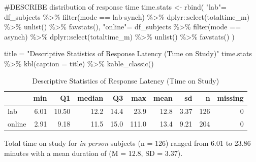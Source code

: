 \documentclass[
  letterpaper,
  DIV=11,
  numbers=noendperiod]{scrreprt}
\newenvironment{Shaded}{\begin{snugshade}}{\end{snugshade}}
\newcommand{\AttributeTok}[1]{\textcolor[rgb]{0.40,0.45,0.13}{#1}}
\newcommand{\CommentTok}[1]{\textcolor[rgb]{0.37,0.37,0.37}{#1}}
\newcommand{\FunctionTok}[1]{\textcolor[rgb]{0.28,0.35,0.67}{#1}}
\newcommand{\NormalTok}[1]{\textcolor[rgb]{0.00,0.23,0.31}{#1}}
\newcommand{\OtherTok}[1]{\textcolor[rgb]{0.00,0.23,0.31}{#1}}
\newcommand{\SpecialCharTok}[1]{\textcolor[rgb]{0.37,0.37,0.37}{#1}}
\newcommand{\StringTok}[1]{\textcolor[rgb]{0.13,0.47,0.30}{#1}}
\begin{document}
\begin{Shaded}
\begin{Highlighting}[]
\CommentTok{\#DESCRIBE distribution of response time}
\NormalTok{time.stats }\OtherTok{\textless{}{-}} \FunctionTok{rbind}\NormalTok{(}
  \StringTok{"lab"}\OtherTok{=}\NormalTok{ df\_subjects }\SpecialCharTok{\%\textgreater{}\%} \FunctionTok{filter}\NormalTok{(mode }\SpecialCharTok{==} \StringTok{\textquotesingle{}lab{-}synch\textquotesingle{}}\NormalTok{) }\SpecialCharTok{\%\textgreater{}\%}\NormalTok{ dplyr}\SpecialCharTok{::}\FunctionTok{select}\NormalTok{(totaltime\_m) }\SpecialCharTok{\%\textgreater{}\%} \FunctionTok{unlist}\NormalTok{() }\SpecialCharTok{\%\textgreater{}\%} \FunctionTok{favstats}\NormalTok{(),}
  \StringTok{"online"}\OtherTok{=}\NormalTok{ df\_subjects }\SpecialCharTok{\%\textgreater{}\%} \FunctionTok{filter}\NormalTok{(mode }\SpecialCharTok{==} \StringTok{\textquotesingle{}asynch\textquotesingle{}}\NormalTok{) }\SpecialCharTok{\%\textgreater{}\%}\NormalTok{ dplyr}\SpecialCharTok{::}\FunctionTok{select}\NormalTok{(totaltime\_m) }\SpecialCharTok{\%\textgreater{}\%} \FunctionTok{unlist}\NormalTok{() }\SpecialCharTok{\%\textgreater{}\%} \FunctionTok{favstats}\NormalTok{()}
\NormalTok{)}

\NormalTok{title }\OtherTok{=} \StringTok{"Descriptive Statistics of Response Latency (Time on Study)"}
\NormalTok{time.stats }\SpecialCharTok{\%\textgreater{}\%} \FunctionTok{kbl}\NormalTok{(}\AttributeTok{caption =}\NormalTok{ title) }\SpecialCharTok{\%\textgreater{}\%} \FunctionTok{kable\_classic}\NormalTok{()}
\end{Highlighting}
\end{Shaded}

\begin{table}

\caption{Descriptive Statistics of Response Latency (Time on Study)}
\centering
\begin{tabular}[t]{l|r|r|r|r|r|r|r|r|r}
\hline
  & min & Q1 & median & Q3 & max & mean & sd & n & missing\\
\hline
lab & 6.01 & 10.50 & 12.2 & 14.4 & 23.9 & 12.8 & 3.37 & 126 & 0\\
\hline
online & 2.91 & 9.18 & 11.5 & 15.0 & 111.0 & 13.4 & 9.21 & 204 & 0\\
\hline
\end{tabular}
\end{table}

Total time on study for \emph{in person} subjects (n = 126) ranged from
6.01 to 23.86 minutes with a mean duration of (M = 12.8, SD = 3.37).
\end{document}
